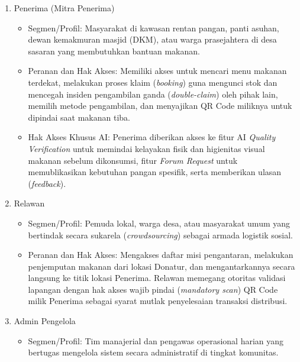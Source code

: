 \begin{enumerate}
\begin{itemize}
\begin{itemize}
            \item \textit{Generate} Konten Media Sosial: Hak spesial untuk secara otomatis menghasilkan gambar visual desain (lengkap dengan stiker verifikasi AI dan logo perusahaan) sekaligus memproduksi konten tulisan (\textit{copywriting}) promosi yang siap diunggah ke platform media sosial.
        \end{itemize}
    \end{itemize}
    \item Penerima (Mitra Penerima)
    \begin{itemize}
        \item Segmen/Profil: Masyarakat di kawasan rentan pangan, panti asuhan, dewan kemakmuran masjid (DKM), atau warga prasejahtera di desa sasaran yang membutuhkan bantuan makanan.
        \item Peranan dan Hak Akses: Memiliki akses untuk mencari menu makanan terdekat, melakukan proses klaim (\textit{booking}) guna mengunci stok dan mencegah insiden pengambilan ganda (\textit{double-claim}) oleh pihak lain, memilih metode pengambilan, dan menyajikan QR Code miliknya untuk dipindai saat makanan tiba.
        \item Hak Akses Khusus AI: Penerima diberikan akses ke fitur AI \textit{Quality Verification} untuk memindai kelayakan fisik dan higienitas visual makanan sebelum dikonsumsi, fitur \textit{Forum Request} untuk memublikasikan kebutuhan pangan spesifik, serta memberikan ulasan (\textit{feedback}).
    \end{itemize}
    \item Relawan
    \begin{itemize}
        \item Segmen/Profil: Pemuda lokal, warga desa, atau masyarakat umum yang bertindak secara sukarela (\textit{crowdsourcing}) sebagai armada logistik sosial.
        \item Peranan dan Hak Akses: Mengakses daftar misi pengantaran, melakukan penjemputan makanan dari lokasi Donatur, dan mengantarkannya secara langsung ke titik lokasi Penerima. Relawan memegang otoritas validasi lapangan dengan hak akses wajib pindai (\textit{mandatory scan}) QR Code milik Penerima sebagai syarat mutlak penyelesaian transaksi distribusi.
    \end{itemize}
    \item Admin Pengelola
    \begin{itemize}
        \item Segmen/Profil: Tim manajerial dan pengawas operasional harian yang bertugas mengelola sistem secara administratif di tingkat komunitas.

\end{itemize}
\end{enumerate}
